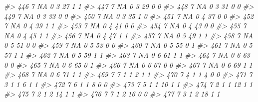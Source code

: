 \documentclass[]{book}
\newenvironment{Shaded}{\begin{snugshade}}{\end{snugshade}}
\newcommand{\CommentTok}[1]{\textcolor[rgb]{0.56,0.35,0.01}{\textit{#1}}}
\begin{document}
\begin{Shaded}
\begin{Highlighting}[]
\CommentTok{#> 446     7        NA         0     3    27           1            1}
\CommentTok{#> 447     7        NA         0     3    29           0            0}
\CommentTok{#> 448     7        NA         0     3    31           0            0}
\CommentTok{#> 449     7        NA         0     3    33           0            0}
\CommentTok{#> 450     7        NA         0     3    35           1            0}
\CommentTok{#> 451     7        NA         0     4    37           0            0}
\CommentTok{#> 452     7        NA         0     4    39           1            1}
\CommentTok{#> 453     7        NA         0     4    41           0            0}
\CommentTok{#> 454     7        NA         0     4    43           0            0}
\CommentTok{#> 455     7        NA         0     4    45           1            1}
\CommentTok{#> 456     7        NA         0     4    47           1            1}
\CommentTok{#> 457     7        NA         0     5    49           1            1}
\CommentTok{#> 458     7        NA         0     5    51           0            0}
\CommentTok{#> 459     7        NA         0     5    53           0            0}
\CommentTok{#> 460     7        NA         0     5    55           0            1}
\CommentTok{#> 461     7        NA         0     5    57           1            1}
\CommentTok{#> 462     7        NA         0     5    59           1            1}
\CommentTok{#> 463     7        NA         0     6    61           1            1}
\CommentTok{#> 464     7        NA         0     6    63           0            0}
\CommentTok{#> 465     7        NA         0     6    65           0            1}
\CommentTok{#> 466     7        NA         0     6    67           0            0}
\CommentTok{#> 467     7        NA         0     6    69           1            1}
\CommentTok{#> 468     7        NA         0     6    71           1            1}
\CommentTok{#> 469     7         7         1     1     2           1            1}
\CommentTok{#> 470     7         4         1     1     4           0            0}
\CommentTok{#> 471     7         3         1     1     6           1            1}
\CommentTok{#> 472     7         6         1     1     8           0            0}
\CommentTok{#> 473     7         5         1     1    10           1            1}
\CommentTok{#> 474     7         2         1     1    12           1            1}
\CommentTok{#> 475     7         2         1     2    14           1            1}
\CommentTok{#> 476     7         7         1     2    16           0            0}
\CommentTok{#> 477     7         3         1     2    18           1            1}

\end{Highlighting}
\end{Shaded}
\end{document}

